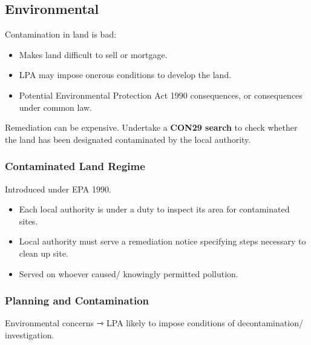 \documentclass[
]{article}
\providecommand{\tightlist}{%
  \setlength{\itemsep}{0pt}\setlength{\parskip}{0pt}}
\begin{document}
\hypertarget{environmental}{%
\subsection{Environmental}\label{environmental}}

Contamination in land is bad:

\begin{itemize}
\tightlist
\item
  Makes land difficult to sell or mortgage.
\item
  LPA may impose onerous conditions to develop the land.
\item
  Potential Environmental Protection Act 1990 consequences, or
  consequences under common law.
\end{itemize}

Remediation can be expensive. Undertake a \textbf{CON29 search} to check
whether the land has been designated contaminated by the local
authority.

\hypertarget{contaminated-land-regime}{%
\subsubsection{Contaminated Land
Regime}\label{contaminated-land-regime}}

Introduced under EPA 1990.

\begin{itemize}
\tightlist
\item
  Each local authority is under a duty to inspect its area for
  contaminated sites.
\item
  Local authority must serve a remediation notice specifying steps
  necessary to clean up site.
\item
  Served on whoever caused/ knowingly permitted pollution.
\end{itemize}

\hypertarget{planning-and-contamination}{%
\subsubsection{Planning and
Contamination}\label{planning-and-contamination}}

Environmental concerns ⇾ LPA likely to impose conditions of
decontamination/ investigation.
\end{document}
